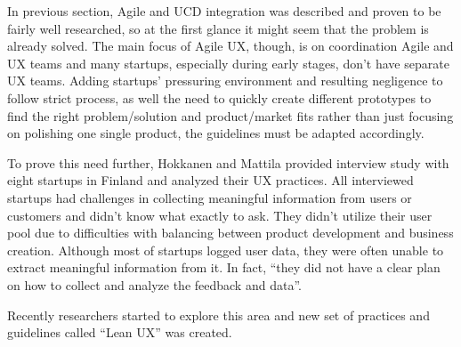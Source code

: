 \documentclass{article}
\begin{document}
In previous section, Agile and UCD integration was described and proven to be fairly well researched, so at the first glance it might seem that the problem is already solved. The main focus of Agile UX, though, is on coordination Agile and UX teams and many startups, especially during early stages, don't have separate UX teams. Adding startups' pressuring environment and resulting negligence to follow strict process, as well the need to quickly create different prototypes to find the right problem/solution and product/market fits rather than just focusing on polishing one single product, the guidelines must be adapted accordingly.

To prove this need further, Hokkanen and Mattila provided interview study with eight startups in Finland \cite{hokkanen2015ux} and analyzed their UX practices. All interviewed startups had challenges in collecting meaningful information from users or customers and didn't know what exactly to ask. They didn't utilize their user pool due to difficulties with balancing between product development and business creation. Although most of startups logged user data, they were often unable to extract meaningful information from it. In fact, ``they did not have a clear plan on how to collect and analyze the feedback and data''.

Recently researchers started to explore this area and new set of practices and guidelines called ``Lean UX'' was created.
\end{document}
